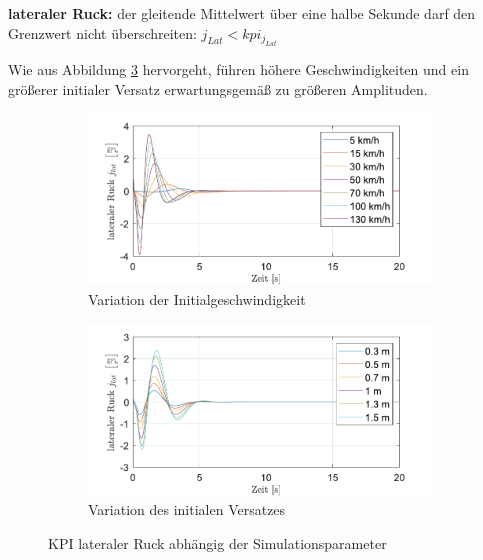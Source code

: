 \medskip\noindent\textbf{lateraler Ruck:} der gleitende Mittelwert über eine halbe Sekunde darf den Grenzwert nicht überschreiten: $j_{Lat} < kpi_{j_{Lat}}$

\noindent Wie aus Abbildung \ref{fig:Straight_Offset_j-Lat} hervorgeht, führen höhere Geschwindigkeiten und ein größerer initialer Versatz erwartungsgemäß zu größeren Amplituden.
\begin{figure}[ht]
    \centering
    \begin{subfigure}[b]{.49\textwidth}
        \centering
        \includegraphics[width=\textwidth]{figures/3_Implementierung/Straight_Offset/varVelo_1mOffset_j-Lat.pdf}
        \caption{Variation der Initialgeschwindigkeit}
        \label{fig:varVelo_1mOffset_j-Lat}
    \end{subfigure}
    \hfill
    \begin{subfigure}[b]{.49\textwidth}
        \centering
        \includegraphics[width=\textwidth]{figures/3_Implementierung/Straight_Offset/varOffset_50kmh_j-Lat.pdf}
        \caption{Variation des initialen Versatzes}
        \label{fig:varOffset_50kmh_j-Lat}
    \end{subfigure}
    \caption{KPI lateraler Ruck abhängig der Simulationsparameter}
    \label{fig:Straight_Offset_j-Lat}
\end{figure}

